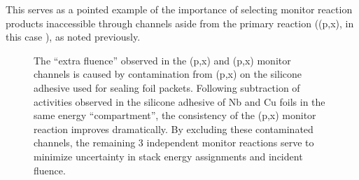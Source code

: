 This serves as a pointed example of the importance of selecting monitor reaction products inaccessible through channels aside from the primary reaction ((p,x), in this case ), as noted previously.








\begin{figure}
    \centering
    \caption{The \enquote{extra fluence} observed in the  (p,x) and (p,x) monitor channels is caused by contamination from (p,x) on the silicone adhesive used for sealing foil packets. Following subtraction of  activities observed in the silicone adhesive of Nb and Cu foils in the same energy \enquote{compartment}, the consistency of the (p,x) monitor reaction improves  dramatically.  By excluding these contaminated channels, the remaining 3 independent monitor reactions serve to minimize uncertainty in stack energy assignments and incident fluence.}
     \label{fig:na_subtraction}
\end{figure}

